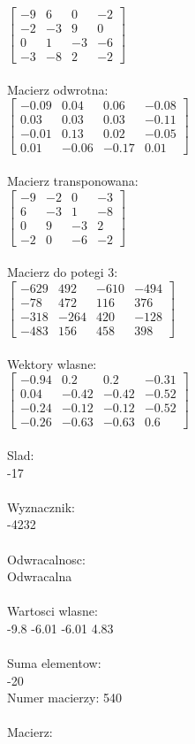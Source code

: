 \documentclass[a4paper,12pt]{article}
\begin{document}
$\begin{bmatrix} -9&6&0&-2\\-2&-3&9&0\\0&1&-3&-6\\-3&-8&2&-2 \end{bmatrix}$
\\
\\
Macierz odwrotna:\\

$\begin{bmatrix} -0.09&0.04&0.06&-0.08\\0.03&0.03&0.03&-0.11\\-0.01&0.13&0.02&-0.05\\0.01&-0.06&-0.17&0.01 \end{bmatrix}$
\\
\\
Macierz transponowana:\\

$\begin{bmatrix} -9&-2&0&-3\\6&-3&1&-8\\0&9&-3&2\\-2&0&-6&-2 \end{bmatrix}$
\\
\\
Macierz do potegi 3:\\

$\begin{bmatrix} -629&492&-610&-494\\-78&472&116&376\\-318&-264&420&-128\\-483&156&458&398 \end{bmatrix}$
\\
\\
Wektory wlasne:\\

$\begin{bmatrix} -0.94&0.2&0.2&-0.31\\0.04&-0.42&-0.42&-0.52\\-0.24&-0.12&-0.12&-0.52\\-0.26&-0.63&-0.63&0.6 \end{bmatrix}$
\\
\\
Slad:\\
-17
\\
\\
Wyznacznik:\\
-4232
\\
\\
Odwracalnosc:\\
Odwracalna
\\
\\
Wartosci wlasne:\\
-9.8 -6.01 -6.01 4.83
\\
\\
Suma elementow:\\
-20
\\
\newpage
Numer macierzy:
540
\\
\\
Macierz:\\
\end{document}
